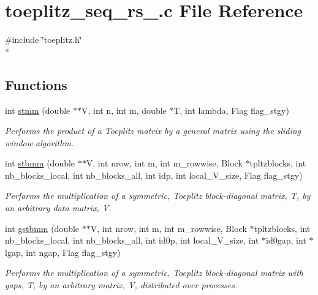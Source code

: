 \section{toeplitz\-\_\-seq\-\_\-rs\-\_.\-c File Reference}
\label{toeplitz__seq__rs__20121003_8c}
{\ttfamily \#include \char`\"{}toeplitz.\-h\char`\"{}}\\*
\subsection*{Functions}
\begin{DoxyCompactItemize}
\item 
int \hyperlink{toeplitz__seq__rs__20121003_8c_ab2face64bf4e429b38b3ae1a6701cc78}{stmm} (double $\ast$$\ast$V, int n, int m, double $\ast$T, int lambda, Flag flag\-\_\-stgy)
\begin{DoxyCompactList}\small\item\em Performs the product of a Toeplitz matrix by a general matrix using the sliding window algorithm. \end{DoxyCompactList}\item 
int \hyperlink{toeplitz__seq__rs__20121003_8c_a906042d3b025b1b12303b8e641c83597}{stbmm} (double $\ast$$\ast$V, int nrow, int m, int m\-\_\-rowwise, Block $\ast$tpltzblocks, int nb\-\_\-blocks\-\_\-local, int nb\-\_\-blocks\-\_\-all, int idp, int local\-\_\-\-V\-\_\-size, Flag flag\-\_\-stgy)
\begin{DoxyCompactList}\small\item\em Performs the multiplication of a symmetric, Toeplitz block-\/diagonal matrix, T, by an arbitrary data matrix, V. \end{DoxyCompactList}\item 
int \hyperlink{toeplitz__seq__rs__20121003_8c_a80d15a369c9e2296a7a0a8df8c2faa10}{gstbmm} (double $\ast$$\ast$V, int nrow, int m, int m\-\_\-rowwise, Block $\ast$tpltzblocks, int nb\-\_\-blocks\-\_\-local, int nb\-\_\-blocks\-\_\-all, int id0p, int local\-\_\-\-V\-\_\-size, int $\ast$id0gap, int $\ast$lgap, int ngap, Flag flag\-\_\-stgy)
\begin{DoxyCompactList}\small\item\em Performs the multiplication of a symmetric, Toeplitz block-\/diagonal matrix with gaps, T, by an arbitrary matrix, V, distributed over processes. \end{DoxyCompactList}\end{DoxyCompactItemize}


